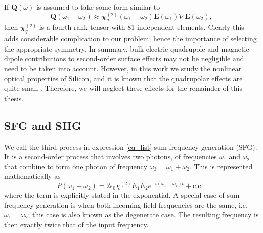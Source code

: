 If $\mathbf{Q}(\omega)$ is assumed to take some form similar to
\begin{equation}
\mathbf{Q}(\omega_{1}+\omega_{2})\approx \boldsymbol{\chi}^{(2)}_{q}(\omega_{1}
+ \omega_{2})\mathbf{E}(\omega_{1})\nabla\mathbf{E}(\omega_{2}),
\end{equation}
then $\boldsymbol{\chi}^{(2)}_{q}$ is a fourth-rank tensor with 81 independent
elements. Clearly this adds considerable complication to our problem; hence the
importance of selecting the appropriate symmetry. In summary, bulk electric
quadrupole and magnetic dipole contributions to second-order surface effects may
not be negligible and need to be taken into account. However, in this work we
study the nonlinear optical properties of Silicon, and it is known that the
quadrupolar effects are quite small \cite{aktsipetrovJETP86, sipePRB87,
xuJVST97, guyotPRB88, downerSIA01, shenAPB99}. Therefore, we will neglect these
effects for the remainder of this thesis.



\subsection{SFG and SHG}\label{chap_theory_sum}

We call the third process in expression \eqref{eq_list} sum-frequency generation
(SFG). It is a second-order process that involves two photons, of frequencies
$\omega_{1}$ and $\omega_{2}$ that combine to form one photon of frequency
$\omega_{3} = \omega_{1} + \omega_{2}$. This is represented mathematically as
\begin{equation}
P(\omega_{1}+\omega_{2})
= 2\epsilon_{0}\chi^{(2)}E_{1}E_{2}e^{-i(\omega_{1}+\omega_{2})t} + \text{c.c.},
\end{equation}
where the term is explicitly stated in the exponential. A special case of
sum-frequency generation is when both incoming field frequencies are the same,
i.e. $\omega_{1} = \omega_{2}$; this case is also known as the degenerate case.
The resulting frequency is then exactly twice that of the input frequency.

